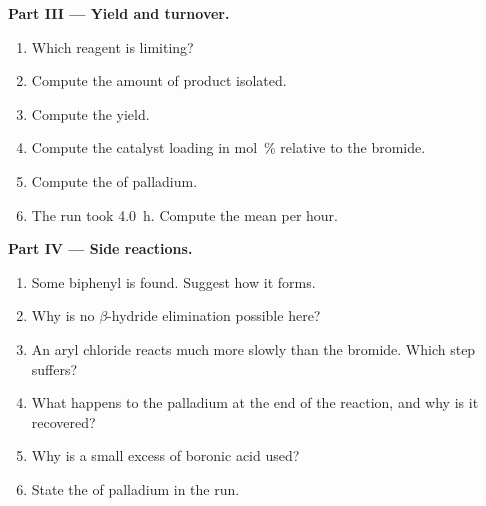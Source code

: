 \begin{problem}
\medskip
\noindent\textbf{Part III --- Yield and turnover.}
\begin{enumerate}[resume]
  \item Which reagent is limiting?
  \item Compute the amount of product isolated.
  \item Compute the yield.
  \item Compute the catalyst loading in mol~\% relative to the bromide.
  \item Compute the  of palladium.
  \item The run took \qty{4.0}{h}. Compute the mean  per hour.
\end{enumerate}

\medskip
\noindent\textbf{Part IV --- Side reactions.}
\begin{enumerate}[resume]
  \item Some biphenyl  is found. Suggest how it forms.
  \item Why is no $\beta$-hydride elimination possible here?
  \item An aryl chloride reacts much more slowly than the bromide. Which step suffers?
  \item What happens to the palladium at the end of the reaction, and why is it recovered?
  \item Why is a small excess of boronic acid used?
  \item State the  of palladium in the run.
\end{enumerate}
\end{problem}
